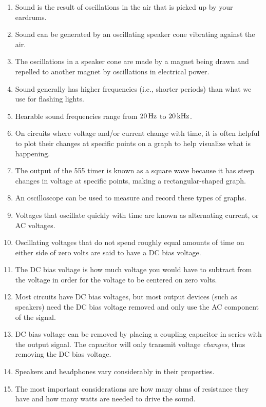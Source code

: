 \begin{enumerate}
\item Sound is the result of oscillations in the air that is picked up by your eardrums.
\item Sound can be generated by an oscillating speaker cone vibrating against the air.
\item The oscillations in a speaker cone are made by a magnet being drawn and repelled to another magnet by oscillations in electrical power.
\item Sound generally has higher frequencies (i.e., shorter periods) than what we use for flashing lights.
\item Hearable sound frequencies range from $20\,\si{\hertz}$ to $20\,\si{\kilo\hertz}$.
\item On circuits where voltage and/or current change with time, it is often helpful to plot their changes at specific points on a graph to help visualize what is happening.
\item The output of the 555 timer is known as a square wave because it has steep changes in voltage at specific points, making a rectangular-shaped graph.
\item An oscilloscope can be used to measure and record these types of graphs.
\item Voltages that oscillate quickly with time are known as alternating current, or AC voltages. %
\item Oscillating voltages that do not spend roughly equal amounts of time on either side of zero volts are said to have a DC bias voltage.
\item The DC bias voltage is how much voltage you would have to subtract from the voltage in order for the voltage to be centered on zero volts.  %
\item Most circuits have DC bias voltages, but most output devices (such as speakers) need the DC bias voltage removed and only use the AC component of the signal.
\item DC bias voltage can be removed by placing a coupling capacitor in series with the output signal.  The capacitor will only transmit voltage \emph{changes}, thus removing the DC bias voltage.
\item Speakers and headphones vary considerably in their properties.
\item The most important considerations are how many ohms of resistance they have and how many watts are needed to drive the sound.

\end{enumerate}
